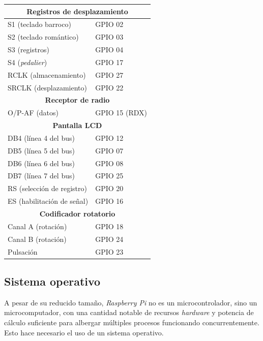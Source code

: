 \begin{center}
	\begin{tabular}{|l|l|}
		\hline \multicolumn{2}{|c|}{\textbf{Registros de desplazamiento}} \\
		\hline S1 (teclado barroco) & GPIO 02 \\ 
		\hline S2 (teclado romántico) & GPIO 03 \\ 
		\hline S3 (registros) & GPIO 04 \\ 
		\hline S4 (\textit{pedalier}) & GPIO 17 \\ 
		\hline RCLK (almacenamiento) & GPIO 27 \\ 
		\hline SRCLK (desplazamiento) & GPIO 22 \\ 
		\hline \multicolumn{2}{|c|}{\textbf{Receptor de radio}} \\
		\hline O/P-AF (datos) & GPIO 15 (RDX) \\ 
		\hline \multicolumn{2}{|c|}{\textbf{Pantalla LCD}} \\
		\hline DB4 (línea 4 del bus) & GPIO 12 \\ 
		\hline DB5 (línea 5 del bus) & GPIO 07 \\ 
		\hline DB6 (línea 6 del bus) & GPIO 08 \\ 
		\hline DB7 (línea 7 del bus) & GPIO 25 \\
		\hline RS (selección de registro) & GPIO 20 \\ 
		\hline ES (habilitación de señal) & GPIO 16 \\ 
		\hline \multicolumn{2}{|c|}{\textbf{Codificador rotatorio}} \\
		\hline Canal A (rotación) & GPIO 18 \\ 
		\hline Canal B (rotación) & GPIO 24 \\ 
		\hline Pulsación & GPIO 23 \\ 
		\hline 
	\end{tabular}
	\smallskip
\end{center}

\smallskip

\subsection{Sistema operativo}

A pesar de su reducido tamaño, \textit{Raspberry Pi} no es un microcontrolador, sino un microcomputador, con una cantidad notable de recursos \textit{hardware} y potencia de cálculo suficiente para albergar múltiples procesos funcionando concurrentemente. Esto hace necesario el uso de un sistema operativo.

